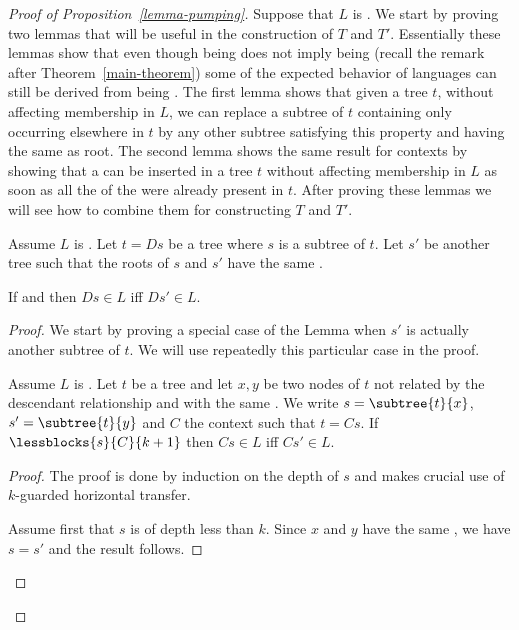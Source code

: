 \begin{proof}[Proof of Proposition~\ref{lemma-pumping}]

  Suppose that $L$ is \ktame. We start by proving two lemmas that will be
  useful in the construction of $T$ and $T'$. Essentially these lemmas show
  that even though being \ktame does not imply being  (recall
  the remark after Theorem~\ref{main-theorem}) some of the expected behavior of
   languages can still be derived from being \ktame. The first
  lemma shows that given a tree $t$, without affecting membership in $L$, we
  can replace a subtree of $t$ containing only  occurring elsewhere
  in $t$ by any other subtree satisfying this property and having the same
  \ktype as root. The second lemma shows the same result for contexts by
  showing that a \kloop can be inserted in a tree $t$ without affecting
  membership in $L$ as soon as all the  of the \kloop were
  already present in $t$. After proving these lemmas we will see how to
  combine them for constructing $T$ and $T'$.

\begin{lem}\label{claim-transfer-branch} 
  Assume $L$ is \ktame.  Let $t=Ds$ be a tree where $s$ is a subtree of $t$.
  Let $s'$ be another tree such that the roots of $s$ and $s'$ have the same
  \ktype.

If  and  then
$Ds\in L$ iff $Ds'\in L$.
\end{lem}

\begin{proof}

  We start by proving a special case of the Lemma when $s'$ is actually another
  subtree of $t$. We will use repeatedly this particular case in the proof.

  \begin{claim} \label{claim-transfer-enhanced} Assume $L$ is \ktame. Let $t$
    be a tree and let $x,y$ be two nodes of $t$ not related by the descendant
    relationship and with the same \ktype. We write $s = \subtree{t}{x}$,
    $s' = \subtree{t}{y}$ and $C$ the context such that $t = Cs$.
    If $\lessblocks{s}{C}{k+1}$ then $Cs \in L$ iff $Cs' \in L$.
\end{claim}


\begin{proof} The proof is done by induction on the depth of $s$ and makes
  crucial use of $k$-guarded horizontal transfer.

  Assume first that $s$ is of depth less than $k$. Since $x$ and $y$ have the same
  \ktype, we have $s = s'$ and the result follows.


\end{proof}
\end{proof}
\end{proof}
